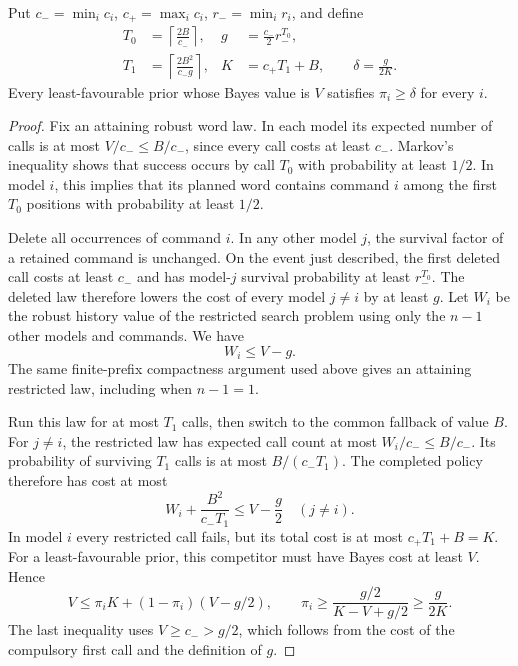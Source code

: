 \begin{lemma}
\label{lem:r80-finite-search-prior-cap}
Put $c_- =\min_i c_i$, $c_+=\max_i c_i$, $r_- =\min_i r_i$, and
define
\begin{equation}\label{eq:r80-finite-search-prior-constants}
 \begin{aligned}
 T_0&=\left\lceil\frac{2B}{c_-}\right\rceil,
 &g&=\frac{c_-}{2}r_-^{T_0},\\
 T_1&=\left\lceil\frac{2B^2}{c_-g}\right\rceil,
 &K&=c_+T_1+B,\qquad \delta=\frac{g}{2K}.
 \end{aligned}
\end{equation}
Every least-favourable prior whose Bayes value is $V$ satisfies
$\pi_i\ge\delta$ for every $i$.
\end{lemma}
\begin{proof}
Fix an attaining robust word law.  In each model its expected number
of calls is at most $V/c_-\le B/c_-$, since every call costs at
least $c_-$.  Markov's inequality shows that success occurs by call
$T_0$ with probability at least $1/2$.  In model $i$, this implies
that its planned word contains command $i$ among the first $T_0$
positions with probability at least $1/2$.

Delete all occurrences of command $i$.  In any other model $j$, the
survival factor of a retained command is unchanged.  On the event
just described, the first deleted call costs at least $c_-$ and has
model-$j$ survival probability at least $r_-^{T_0}$.  The deleted
law therefore lowers the cost of every model $j\ne i$ by at least
$g$.  Let $W_i$ be the robust history value of the restricted search
problem using only the $n-1$ other models and commands.  We have
\begin{equation}\label{eq:r80-finite-search-deletion-gap}
 W_i\le V-g.
\end{equation}
The same finite-prefix compactness argument used above gives an
attaining restricted law, including when $n-1=1$.

Run this law for at most $T_1$ calls, then switch to the common
fallback of value $B$.  For $j\ne i$, the restricted law has expected
call count at most $W_i/c_-\le B/c_-$.  Its probability of surviving
$T_1$ calls is at most $B/(c_-T_1)$.  The completed policy therefore
has cost at most
\[
 W_i+\frac{B^2}{c_-T_1}\le V-\frac g2
 \quad (j\ne i).
\]
In model $i$ every restricted call fails, but its total cost is at
most $c_+T_1+B=K$.  For a least-favourable prior, this competitor
must have Bayes cost at least $V$.  Hence
\[
 V\le\pi_iK+(1-\pi_i)(V-g/2),\qquad
 \pi_i\ge\frac{g/2}{K-V+g/2}\ge\frac{g}{2K}.
\]
The last inequality uses $V\ge c_->g/2$, which follows from the
cost of the compulsory first call and the definition of $g$.
\end{proof}

